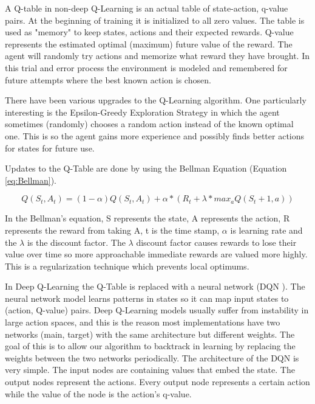 \documentclass[b5paper]{book}
\let\cite\parencite
\begin{document}
A Q-table in non-deep Q-Learning is an actual table of state-action, q-value pairs. At the beginning of training it is initialized to all zero values. The table is used as "memory" to keep states, actions and their expected rewards. Q-value represents the estimated optimal (maximum) future value of the reward. The agent will randomly try actions and memorize what reward they have brought. In this trial and error process the environment is modeled and remembered for future attempts where the best known action is chosen.

There have been various upgrades to the Q-Learning algorithm. One particularly interesting is the Epsilon-Greedy Exploration Strategy in which the agent sometimes (randomly) chooses a random action instead of the known optimal one. This is so the agent gains more experience and possibly finds better actions for states for future use.

Updates to the Q-Table are done by using the Bellman Equation \cite{baird1999gradient} (Equation \ref{eq:Bellman}).

\begin{equation}
\label{eq:Bellman}
Q(S_t, A_t) = (1 - \alpha) Q(S_t, A_t) + \alpha * (R_t + \lambda * max_a Q(S_t+1, a))
\end{equation}

In the Bellman's equation, S represents the state, A represents the action, R represents the reward from taking A, t is the time stamp, \(\alpha\) is learning rate and the \(\lambda\) is the discount factor. The \(\lambda\) discount factor causes rewards to lose their value over time so more approachable immediate rewards are valued more highly. This is a regularization technique which prevents local optimums.

In Deep Q-Learning the Q-Table is replaced with a neural network (DQN \cite{mnih2013playing}). The neural network model learns patterns in states so it can map input states to (action, Q-value) pairs. Deep Q-Learning models usually suffer from instability in large action spaces, and this is the reason most implementations have two networks (main, target) with the same architecture but different weights. The goal of this is to allow our algorithm to backtrack in learning by replacing the weights between the two networks periodically. The architecture of the DQN is very simple. The input nodes are containing values that embed the state. The output nodes represent the actions. Every output node represents a certain action while the value of the node is the action's q-value. 
\end{document}

